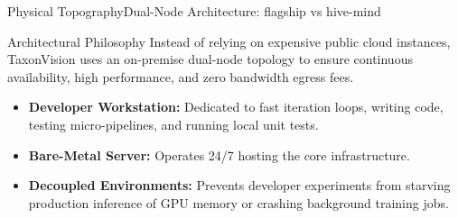 \begin{frame}{Physical Topography}{Dual-Node Architecture: flagship vs hive-mind}
    \begin{block}{Architectural Philosophy}
        Instead of relying on expensive public cloud instances, TaxonVision uses an on-premise dual-node topology to ensure continuous availability, high performance, and zero bandwidth egress fees.
    \end{block}

    \begin{itemize}
        \item \textbf{Developer Workstation:} Dedicated to fast iteration loops, writing code, testing micro-pipelines, and running local unit tests.
        \item \textbf{Bare-Metal Server:} Operates 24/7 hosting the core infrastructure.
        \item \textbf{Decoupled Environments:} Prevents developer experiments from starving production inference of GPU memory or crashing background training jobs.
    \end{itemize}

\end{frame}


